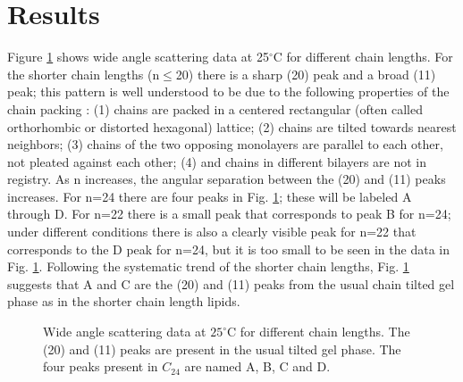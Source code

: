 \section{Results}
 
Figure \ref{anol:fig1} shows wide angle scattering data at 25$^{\circ}$C 
for different chain
lengths.  For the shorter chain lengths (n$\leq$20) there is a sharp (20) 
peak and
a broad (11) peak; this pattern is well understood to be due to the following
properties of the chain packing \cite{Sun94,HenHos83,HenRus91,Smi88}:
(1) chains are packed in a centered rectangular (often called
orthorhombic or distorted hexagonal) lattice; 
(2) chains are tilted towards nearest neighbors;
(3) chains of the two opposing monolayers are parallel to each other, not 
pleated against each other;
(4) and chains in different bilayers are not in registry.  As n increases,
the angular separation between the (20) and (11) peaks increases.
For n=24 there are four peaks in Fig. \ref{anol:fig1}; these will be
labeled A through D.  For n=22 there is a small peak that corresponds to
peak B for n=24; under different conditions there is also a clearly
visible peak for n=22 that corresponds to the D peak
for n=24, but it is too small to be seen in the data in Fig. \ref{anol:fig1}.
Following the systematic trend of the shorter chain
lengths, Fig. \ref{anol:fig1} suggests that A and C are the (20) and (11) peaks from the 
usual chain tilted gel phase as in the shorter chain length lipids.

\begin{figure}[t]
\centerline {}
\caption{Wide angle scattering data at $25^{\circ}$C for different chain
lengths. The (20) and (11) peaks are present in the usual tilted gel phase. The
four
peaks present in $C_{24}$ are named A, B, C and D.
\label{anol:fig1}}
\end{figure}



